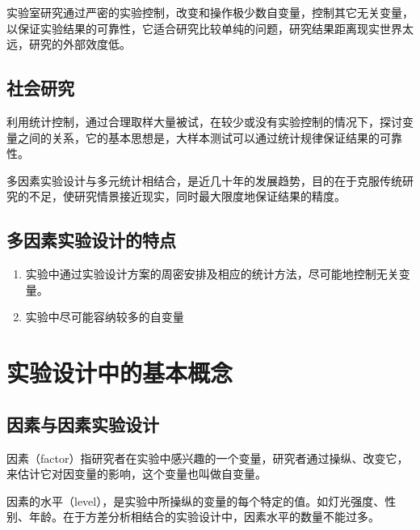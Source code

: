 \documentclass[]{ctexbook}
\providecommand{\tightlist}{%
  \setlength{\itemsep}{0pt}\setlength{\parskip}{0pt}}
\begin{document}
实验室研究通过严密的实验控制，改变和操作极少数自变量，控制其它无关变量，以保证实验结果的可靠性，它适合研究比较单纯的问题，研究结果距离现实世界太远，研究的外部效度低。

\hypertarget{ux793eux4f1aux7814ux7a76}{%
\subsection{社会研究}\label{ux793eux4f1aux7814ux7a76}}

利用统计控制，通过合理取样大量被试，在较少或没有实验控制的情况下，探讨变量之间的关系，它的基本思想是，大样本测试可以通过统计规律保证结果的可靠性。

多因素实验设计与多元统计相结合，是近几十年的发展趋势，目的在于克服传统研究的不足，使研究情景接近现实，同时最大限度地保证结果的精度。

\hypertarget{ux591aux56e0ux7d20ux5b9eux9a8cux8bbeux8ba1ux7684ux7279ux70b9}{%
\subsection{多因素实验设计的特点}\label{ux591aux56e0ux7d20ux5b9eux9a8cux8bbeux8ba1ux7684ux7279ux70b9}}

\begin{enumerate}
\def\labelenumi{\arabic{enumi}.}
\tightlist
\item
  实验中通过实验设计方案的周密安排及相应的统计方法，尽可能地控制无关变量。
\item
  实验中尽可能容纳较多的自变量
\end{enumerate}

\hypertarget{ux5b9eux9a8cux8bbeux8ba1ux4e2dux7684ux57faux672cux6982ux5ff5}{%
\section{实验设计中的基本概念}\label{ux5b9eux9a8cux8bbeux8ba1ux4e2dux7684ux57faux672cux6982ux5ff5}}

\hypertarget{ux56e0ux7d20ux4e0eux56e0ux7d20ux5b9eux9a8cux8bbeux8ba1}{%
\subsection{因素与因素实验设计}\label{ux56e0ux7d20ux4e0eux56e0ux7d20ux5b9eux9a8cux8bbeux8ba1}}

因素（factor）指研究者在实验中感兴趣的一个变量，研究者通过操纵、改变它，来估计它对因变量的影响，这个变量也叫做自变量。

因素的水平（level），是实验中所操纵的变量的每个特定的值。如灯光强度、性别、年龄。在于方差分析相结合的实验设计中，因素水平的数量不能过多。
\end{document}
